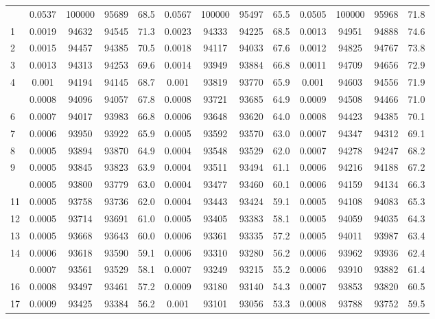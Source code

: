 \documentclass[
  14pt,
]{article}
\begin{document}
\begin{longtable}[t]{lcccccccccccc}
\endfoot
\bottomrule
\endlastfoot
0 & 0.0537 & 100000 & 95689 & 68.5 & 0.0567 & 100000 & 95497 & 65.5 & 0.0505 & 100000 & 95968 & 71.8\\
1 & 0.0019 & 94632 & 94545 & 71.3 & 0.0023 & 94333 & 94225 & 68.5 & 0.0013 & 94951 & 94888 & 74.6\\
2 & 0.0015 & 94457 & 94385 & 70.5 & 0.0018 & 94117 & 94033 & 67.6 & 0.0012 & 94825 & 94767 & 73.8\\
3 & 0.0013 & 94313 & 94253 & 69.6 & 0.0014 & 93949 & 93884 & 66.8 & 0.0011 & 94709 & 94656 & 72.9\\
4 & 0.001 & 94194 & 94145 & 68.7 & 0.001 & 93819 & 93770 & 65.9 & 0.001 & 94603 & 94556 & 71.9\\
\addlinespace
5 & 0.0008 & 94096 & 94057 & 67.8 & 0.0008 & 93721 & 93685 & 64.9 & 0.0009 & 94508 & 94466 & 71.0\\
6 & 0.0007 & 94017 & 93983 & 66.8 & 0.0006 & 93648 & 93620 & 64.0 & 0.0008 & 94423 & 94385 & 70.1\\
7 & 0.0006 & 93950 & 93922 & 65.9 & 0.0005 & 93592 & 93570 & 63.0 & 0.0007 & 94347 & 94312 & 69.1\\
8 & 0.0005 & 93894 & 93870 & 64.9 & 0.0004 & 93548 & 93529 & 62.0 & 0.0007 & 94278 & 94247 & 68.2\\
9 & 0.0005 & 93845 & 93823 & 63.9 & 0.0004 & 93511 & 93494 & 61.1 & 0.0006 & 94216 & 94188 & 67.2\\
\addlinespace
10 & 0.0005 & 93800 & 93779 & 63.0 & 0.0004 & 93477 & 93460 & 60.1 & 0.0006 & 94159 & 94134 & 66.3\\
11 & 0.0005 & 93758 & 93736 & 62.0 & 0.0004 & 93443 & 93424 & 59.1 & 0.0005 & 94108 & 94083 & 65.3\\
12 & 0.0005 & 93714 & 93691 & 61.0 & 0.0005 & 93405 & 93383 & 58.1 & 0.0005 & 94059 & 94035 & 64.3\\
13 & 0.0005 & 93668 & 93643 & 60.0 & 0.0006 & 93361 & 93335 & 57.2 & 0.0005 & 94011 & 93987 & 63.4\\
14 & 0.0006 & 93618 & 93590 & 59.1 & 0.0006 & 93310 & 93280 & 56.2 & 0.0006 & 93962 & 93936 & 62.4\\
\addlinespace
15 & 0.0007 & 93561 & 93529 & 58.1 & 0.0007 & 93249 & 93215 & 55.2 & 0.0006 & 93910 & 93882 & 61.4\\
16 & 0.0008 & 93497 & 93461 & 57.2 & 0.0009 & 93180 & 93140 & 54.3 & 0.0007 & 93853 & 93820 & 60.5\\
17 & 0.0009 & 93425 & 93384 & 56.2 & 0.001 & 93101 & 93056 & 53.3 & 0.0008 & 93788 & 93752 & 59.5\\

\end{longtable}
\end{document}
